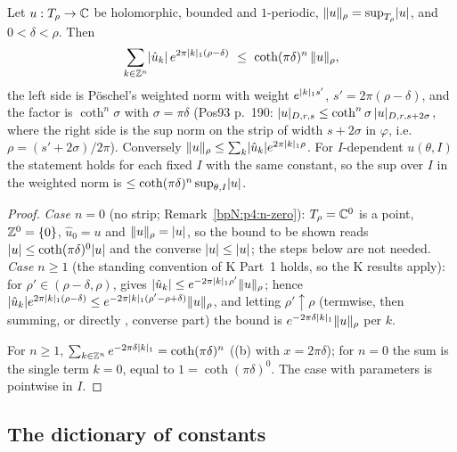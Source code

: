 \begin{lemma}\label{bpN:p1:norm-convert}
Let $u:T_\rho\to\mathbb{C}$ be holomorphic, bounded and $1$-periodic, $\lVert u\rVert_\rho=\sup_{T_\rho}\lvert u\rvert$, and $0<\delta<\rho$. Then
\[\sum_{k\in\mathbb{Z}^n}\lvert \hat u_k\rvert\,e^{2\pi\lvert k\rvert_1(\rho-\delta)}\ \le\ \coth(\pi\delta)^n\,\lVert u\rVert_\rho,\]
the left side is P\"oschel's weighted norm with weight $e^{\lvert k\rvert_1s'}$, $s'=2\pi(\rho-\delta)$, and the factor is $\coth^n\sigma$ with $\sigma=\pi\delta$ (Pos93 p.~190: $\lvert u\rvert_{D,r,s}\le\coth^n\sigma\,\lvert u\rvert_{D,r,s+2\sigma}$, where the right side is the sup norm on the strip of width $s+2\sigma$ in $\varphi$, i.e.\ $\rho=(s'+2\sigma)/2\pi$).
Conversely $\lVert u\rVert_{\rho}\le\sum_k\lvert \hat u_k\rvert e^{2\pi\lvert k\rvert_1\rho}$. For $I$-dependent $u(\theta,I)$ the statement holds for each fixed $I$ with the same constant, so the sup over $I$ in the weighted norm is $\le\coth(\pi\delta)^n\sup_{\theta,I}\lvert u\rvert$.
\end{lemma}
\begin{proof}
\label{stepN:p1:nc-decay} \emph{Case $n=0$} (no strip; Remark~\ref{bpN:p4:n-zero}): $T_\rho=\mathbb{C}^0$ is a point, $\mathbb{Z}^0=\{0\}$, $\hat u_0=u$ and $\lVert u\rVert_\rho=\lvert u\rvert$, so the bound to be shown reads $\lvert u\rvert\le\coth(\pi\delta)^0\lvert u\rvert$ and the converse $\lvert u\rvert\le\lvert u\rvert$; the steps below are not needed. \emph{Case $n\ge1$} (the standing convention of K Part~1 holds, so the K results apply): for $\rho'\in(\rho-\delta,\rho)$,  gives $\lvert \hat u_k\rvert\le e^{-2\pi\lvert k\rvert_1\rho'}\lVert u\rVert_\rho$; hence $\lvert \hat u_k\rvert e^{2\pi\lvert k\rvert_1(\rho-\delta)}\le e^{-2\pi\lvert k\rvert_1(\rho'-\rho+\delta)}\lVert u\rVert_\rho$, and letting $\rho'\uparrow\rho$ (termwise, then summing, or directly , converse part) the bound is $e^{-2\pi\delta\lvert k\rvert_1}\lVert u\rVert_\rho$ per $k$.

\label{stepN:p1:nc-sum} For $n\ge1$, $\sum_{k\in\mathbb{Z}^n}e^{-2\pi\delta\lvert k\rvert_1}=\coth(\pi\delta)^n$ ((b) with $x=2\pi\delta$); for $n=0$ the sum is the single term $k=0$, equal to $1=\coth(\pi\delta)^0$. The case with parameters is pointwise in $I$.
\end{proof}

\subsection{The dictionary of constants}\label{bpN:p1:s-const}

